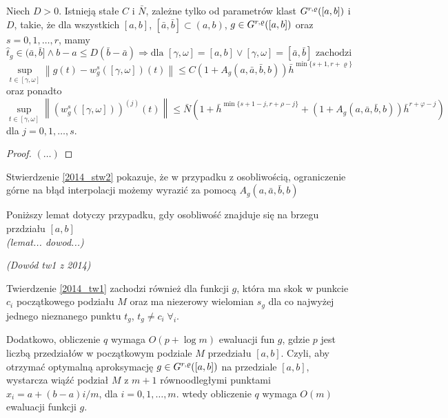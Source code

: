 \documentclass[oik, pdftex, robocza, man]{mgrwms}
\begin{document}
    \begin{stw}
        \label{2014_stw2}
        Niech $D > 0$. Istnieją stałe $C$ i $\bar{N}$, zależne tylko od parametrów klast $G^{r,\varrho}([a,b])$ i $D$, takie, że dla wszystkich $[a,b]$, $[\bar{a}, \bar{b}] \subset (a,b)$, $g \in G^{r,\varrho}([a,b])$ oraz $s=0,1,\dots,r$, mamy
        \begin{equation*}
            \hat{t}_{g} \in (\bar{a}, \bar{b}] \land b-a \leq D(\bar{b}-\bar{a}) \Longrightarrow \text{dla } [\gamma, \omega]=[a, b] \vee [\gamma, \omega]=[\bar{a}, \bar{b}] \text{ zachodzi }
        \end{equation*}
        \begin{equation*}
            \sup _{t \in[\gamma, \omega]}\left\|g(t)-w_{g}^{s}([\gamma, \omega])(t)\right\| \leq C\left(1+A_{g}(a, \bar{a}, \bar{b}, b)\right) \bar{h}^{\min \{s+1, r+\varrho\}}
        \end{equation*}
        oraz ponadto
        \begin{equation*}
            \sup _{t \in[\gamma, \omega]}\left\|\left(w_{g}^{s}([\gamma, \omega])\right)^{(j)}(t)\right\| \leq \bar{N}\left(1+\bar{h}^{\min \{s+1-j, r+\rho-j\}}+\left(1+A_{g}(a, \bar{a}, \bar{b}, b)\right) \bar{h}^{r+\varphi-j}\right)
        \end{equation*}
        dla $j=0,1,\dots,s$.
    \end{stw}
    \begin{proof}
        $(\dots)$
    \end{proof}

    \begin{uw}
        Stwierdzenie \ref{2014_stw2} pokazuje, że w przypadku z osobliwością, ograniczenie górne na błąd interpolacji możemy wyrazić za pomocą $A_{g}(a, \bar{a}, \bar{b}, b)$
    \end{uw}

    Poniższy lemat dotyczy przypadku, gdy osobliwość znajduje się na brzegu przdziału $[a,b]$\\
    \textit{(lemat... dowod...)}

    \textit{(Dowód tw1 z 2014)}

    \begin{uw}
        Twierdzenie \ref{2014_tw1} zachodzi również dla funkcji $g$, która ma skok w punkcie $c_{i}$ początkowego podziału $M$ oraz ma niezerowy wielomian $s_{g}$ dla co najwyżej jednego nieznanego punktu $t_{g}$, $t_{g} \neq c_{i} \; \forall_{i}$.
    \end{uw}

    Dodatkowo, obliczenie $q$ wymaga $O(p+\log m)$ ewaluacji fun $g$, gdzie $p$ jest liczbą przedziałów w początkowym podziale $M$ przedziału $[a,b]$. Czyli, aby otrzymać optymalną aproksymację $g \in G^{r,\varrho}([a,b])$ na przedziale $[a,b]$, wystarcza wiąźć podział $M$ z $m+1$ równoodległymi punktami $x_{i} = a+(b-a)i/m$, dla $i=0,1,\dots,m$. wtedy obliczenie $q$ wymaga $O(m)$ ewaluacji funkcji $g$.
\end{document}
